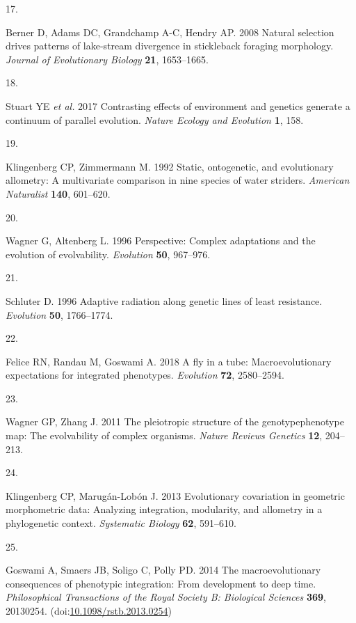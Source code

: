 \documentclass[
  11pt,
]{article}
\newlength{\cslhangindent}
\newlength{\csllabelwidth}
\newlength{\cslentryspacingunit} %
\newenvironment{CSLReferences}[2] %
 {%
  \setlength{\parindent}{0pt}
  \ifodd #1
  \let\oldpar\par
  \def\par{\hangindent=\cslhangindent\oldpar}
  \fi
  \setlength{\parskip}{#2\cslentryspacingunit}
 }%
 {}
\newcommand{\CSLLeftMargin}[1]{\parbox[t]{\csllabelwidth}{#1}}
\newcommand{\CSLRightInline}[1]{\parbox[t]{\linewidth - \csllabelwidth}{#1}\break}
\begin{document}
\begin{CSLReferences}{0}{0}
\leavevmode{}%
\CSLLeftMargin{17. }%
\CSLRightInline{Berner D, Adams DC, Grandchamp A-C, Hendry AP. 2008
Natural selection drives patterns of lake-stream divergence in
stickleback foraging morphology. \emph{Journal of Evolutionary Biology}
\textbf{21}, 1653--1665.}

\leavevmode{}%
\CSLLeftMargin{18. }%
\CSLRightInline{Stuart YE \emph{et al.} 2017 Contrasting effects of
environment and genetics generate a continuum of parallel evolution.
\emph{Nature Ecology and Evolution} \textbf{1}, 158.}

\leavevmode{}%
\CSLLeftMargin{19. }%
\CSLRightInline{Klingenberg CP, Zimmermann M. 1992 Static, ontogenetic,
and evolutionary allometry: A multivariate comparison in nine species of
water striders. \emph{American Naturalist} \textbf{140}, 601--620.}

\leavevmode{}%
\CSLLeftMargin{20. }%
\CSLRightInline{Wagner G, Altenberg L. 1996 Perspective: Complex
adaptations and the evolution of evolvability. \emph{Evolution}
\textbf{50}, 967--976.}

\leavevmode{}%
\CSLLeftMargin{21. }%
\CSLRightInline{Schluter D. 1996 Adaptive radiation along genetic lines
of least resistance. \emph{Evolution} \textbf{50}, 1766--1774.}

\leavevmode{}%
\CSLLeftMargin{22. }%
\CSLRightInline{Felice RN, Randau M, Goswami A. 2018 A fly in a tube:
Macroevolutionary expectations for integrated phenotypes.
\emph{Evolution} \textbf{72}, 2580--2594.}

\leavevmode{}%
\CSLLeftMargin{23. }%
\CSLRightInline{Wagner GP, Zhang J. 2011 The pleiotropic structure of
the genotype{\textendash}phenotype map: The evolvability of complex
organisms. \emph{Nature Reviews Genetics} \textbf{12}, 204--213.}

\leavevmode{}%
\CSLLeftMargin{24. }%
\CSLRightInline{Klingenberg CP, Marugán-Lobón J. 2013 Evolutionary
covariation in geometric morphometric data: Analyzing integration,
modularity, and allometry in a phylogenetic context. \emph{Systematic
Biology} \textbf{62}, 591--610.}

\leavevmode{}%
\CSLLeftMargin{25. }%
\CSLRightInline{Goswami A, Smaers JB, Soligo C, Polly PD. 2014 The
macroevolutionary consequences of phenotypic integration: From
development to deep time. \emph{Philosophical Transactions of the Royal
Society B: Biological Sciences} \textbf{369}, 20130254.
(doi:\href{https://doi.org/10.1098/rstb.2013.0254}{10.1098/rstb.2013.0254})}


\end{CSLReferences}
\end{document}
